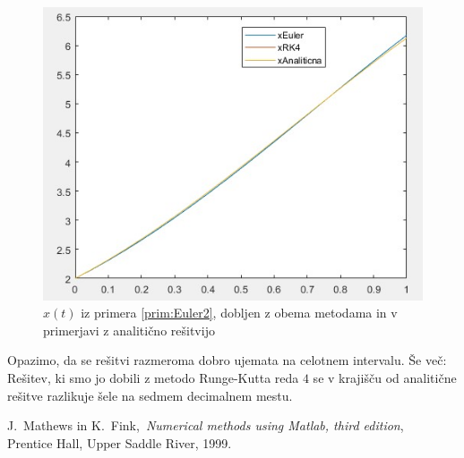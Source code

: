 \documentclass[a4paper, 10pt]{article}
\begin{document}
		\begin{figure}[H]
			\centering
			\includegraphics[scale=0.75]{Prim2x.jpg}
			\caption{$x(t)$ iz primera \ref{prim:Euler2}, dobljen z obema metodama in v primerjavi z analitično rešitvijo}
		\end{figure}
		
		Opazimo, da se rešitvi razmeroma dobro ujemata na celotnem intervalu. Še več: Rešitev, ki smo jo dobili z metodo Runge-Kutta reda $4$ se v krajišču od analitične rešitve razlikuje šele na sedmem decimalnem mestu.
		
	
	\begin{thebibliography}{99}
		
		 J.~Mathews in K.~Fink,~\emph{Numerical methods using Matlab, third edition},~ Prentice Hall, Upper Saddle River, 1999.
		
	\end{thebibliography}
\end{document}
